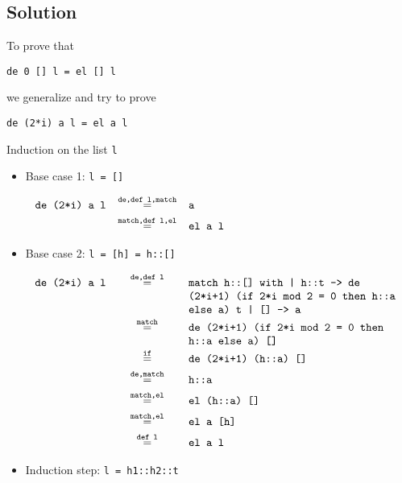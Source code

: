\subsection*{Solution}

To prove that
\begin{center}
    \texttt{de 0 [] l = el [] l}
\end{center}
we generalize and try to prove
\begin{center}
    \texttt{de (2*i) a l = el a l}
\end{center}

Induction on the list \texttt{l}
\begin{itemize}
    \item {
        Base case 1: \texttt{l = []}

        \begin{displaymath}
            \begin{aligned}
                \texttt{de (2*i) a l} 
                &\eq{de,def l,match}{a} \\
                &\eq{match,def l,el}{el a l} \\
            \end{aligned}
        \end{displaymath}
    }
    \item {
        Base case 2: \texttt{l = [h] = h::[]}

        \begin{displaymath}
            \begin{aligned}
                \texttt{de (2*i) a l} 
                &\eq{de,def l}{match h::[] with
                | h::t -> de (2*i+1) (if 2*i mod 2 = 0 then h::a else a) t
                | [] -> a} \\
                &\eq{match}{de (2*i+1) (if 2*i mod 2 = 0 then h::a else a) []} \\
                &\eq{if}{de (2*i+1) (h::a) []} \\
                &\eq{de,match}{h::a} \\
                &\eq{match,el}{el (h::a) []} \\
                &\eq{match,el}{el a [h]} \\
                &\eq{def l}{el a l} \\
            \end{aligned}
        \end{displaymath}
    }
    \item {
        Induction step: \texttt{l = h1::h2::t}

}
\end{itemize}
